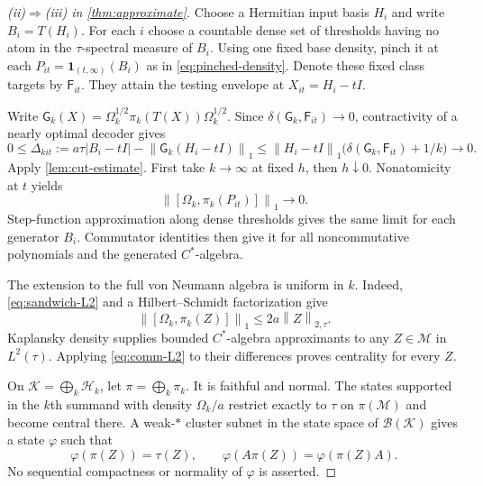 \documentclass[11pt,reqno]{amsart}
\theoremstyle{definition}
\theoremstyle{remark}
\numberwithin{equation}{section}
\newcommand{\M}{\mathcal M}
\newcommand{\HH}{\mathcal H}
\newcommand{\B}{\mathcal B}
\newcommand{\F}{\mathsf F}
\newcommand{\G}{\mathsf G}
\newcommand{\one}{\mathbf 1}
\newcommand{\norm}[1]{\left\lVert#1\right\rVert}
\newcommand{\defic}{\delta}
\begin{document}
\begin{proof}[\textup{(ii)}$\Rightarrow$\textup{(iii)} in \cref{thm:approximate}]
Choose a Hermitian input basis $H_i$ and write $B_i=T(H_i)$. For each $i$ choose a countable dense set of thresholds having no atom in the $\tau$-spectral measure of $B_i$. Using one fixed base density, pinch it at each $P_{it}=\one_{(t,\infty)}(B_i)$ as in \eqref{eq:pinched-density}. Denote these fixed class targets by $\F_{it}$. They attain the testing envelope at $X_{it}=H_i-tI$.

Write $\G_k(X)=\Omega_k^{1/2}\pi_k(T(X))\Omega_k^{1/2}$. Since $\defic(\G_k,\F_{it})\to0$, contractivity of a nearly optimal decoder gives
\[
 0\le\Delta_{kit}:=a\tau|B_i-tI|-\norm{\G_k(H_i-tI)}_1
 \le\norm{H_i-tI}_1\bigl(\defic(\G_k,\F_{it})+1/k\bigr)
 \longrightarrow0.
\]
Apply \cref{lem:cut-estimate}. First take $k\to\infty$ at fixed $h$, then $h\downarrow0$. Nonatomicity at $t$ yields
\[
 \norm{[\Omega_k,\pi_k(P_{it})]}_1\longrightarrow0.
\]
Step-function approximation along dense thresholds gives the same limit for each generator $B_i$. Commutator identities then give it for all noncommutative polynomials and the generated $C^*$-algebra.

The extension to the full von Neumann algebra is uniform in $k$. Indeed, \eqref{eq:sandwich-L2} and a Hilbert--Schmidt factorization give
\begin{equation}\label{eq:comm-L2}
 \norm{[\Omega_k,\pi_k(Z)]}_1\le2a\norm Z_{2,\tau}.
\end{equation}
Kaplansky density supplies bounded $C^*$-algebra approximants to any $Z\in\M$ in $L^2(\tau)$. Applying \eqref{eq:comm-L2} to their differences proves centrality for every $Z$.

On $\mathcal K=\bigoplus_k\HH_k$, let $\pi=\bigoplus_k\pi_k$. It is faithful and normal. The states supported in the $k$th summand with density $\Omega_k/a$ restrict exactly to $\tau$ on $\pi(\M)$ and become central there. A weak-$*$ cluster subnet in the state space of $\B(\mathcal K)$ gives a state $\varphi$ such that
\begin{equation}\label{eq:hypertrace}
 \varphi(\pi(Z))=\tau(Z),\qquad
 \varphi(A\pi(Z))=\varphi(\pi(Z)A).
\end{equation}
No sequential compactness or normality of $\varphi$ is asserted.


\end{proof}
\end{document}
